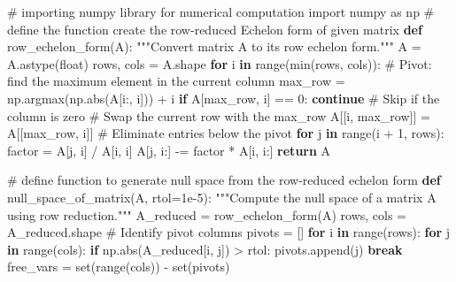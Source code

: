 \documentclass[
  letterpaper,
  DIV=11,
  numbers=noendperiod]{scrreprt}
\newenvironment{Shaded}{\begin{snugshade}}{\end{snugshade}}
\newcommand{\BuiltInTok}[1]{\textcolor[rgb]{0.00,0.23,0.31}{#1}}
\newcommand{\CommentTok}[1]{\textcolor[rgb]{0.37,0.37,0.37}{#1}}
\newcommand{\ControlFlowTok}[1]{\textcolor[rgb]{0.00,0.23,0.31}{\textbf{#1}}}
\newcommand{\DecValTok}[1]{\textcolor[rgb]{0.68,0.00,0.00}{#1}}
\newcommand{\FloatTok}[1]{\textcolor[rgb]{0.68,0.00,0.00}{#1}}
\newcommand{\ImportTok}[1]{\textcolor[rgb]{0.00,0.46,0.62}{#1}}
\newcommand{\KeywordTok}[1]{\textcolor[rgb]{0.00,0.23,0.31}{\textbf{#1}}}
\newcommand{\NormalTok}[1]{\textcolor[rgb]{0.00,0.23,0.31}{#1}}
\newcommand{\OperatorTok}[1]{\textcolor[rgb]{0.37,0.37,0.37}{#1}}
\theoremstyle{plain}
\theoremstyle{definition}
\theoremstyle{remark}
\begin{document}
\begin{Shaded}
\begin{Highlighting}[]
\CommentTok{\# importing numpy library for numerical computation}
\ImportTok{import}\NormalTok{ numpy }\ImportTok{as}\NormalTok{ np}
\CommentTok{\# define the function create the row{-}reduced Echelon form of given matrix}
\KeywordTok{def}\NormalTok{ row\_echelon\_form(A):}
    \CommentTok{"""Convert matrix A to its row echelon form."""}
\NormalTok{    A }\OperatorTok{=}\NormalTok{ A.astype(}\BuiltInTok{float}\NormalTok{)}
\NormalTok{    rows, cols }\OperatorTok{=}\NormalTok{ A.shape}
    \ControlFlowTok{for}\NormalTok{ i }\KeywordTok{in} \BuiltInTok{range}\NormalTok{(}\BuiltInTok{min}\NormalTok{(rows, cols)):}
        \CommentTok{\# Pivot: find the maximum element in the current column}
\NormalTok{        max\_row }\OperatorTok{=}\NormalTok{ np.argmax(np.}\BuiltInTok{abs}\NormalTok{(A[i:, i])) }\OperatorTok{+}\NormalTok{ i}
        \ControlFlowTok{if}\NormalTok{ A[max\_row, i] }\OperatorTok{==} \DecValTok{0}\NormalTok{:}
            \ControlFlowTok{continue}  \CommentTok{\# Skip if the column is zero}
        \CommentTok{\# Swap the current row with the max\_row}
\NormalTok{        A[[i, max\_row]] }\OperatorTok{=}\NormalTok{ A[[max\_row, i]]}
        \CommentTok{\# Eliminate entries below the pivot}
        \ControlFlowTok{for}\NormalTok{ j }\KeywordTok{in} \BuiltInTok{range}\NormalTok{(i }\OperatorTok{+} \DecValTok{1}\NormalTok{, rows):}
\NormalTok{            factor }\OperatorTok{=}\NormalTok{ A[j, i] }\OperatorTok{/}\NormalTok{ A[i, i]}
\NormalTok{            A[j, i:] }\OperatorTok{{-}=}\NormalTok{ factor }\OperatorTok{*}\NormalTok{ A[i, i:]}
    \ControlFlowTok{return}\NormalTok{ A}

\CommentTok{\# define function to generate null space from the row{-}reduced echelon form}
\KeywordTok{def}\NormalTok{ null\_space\_of\_matrix(A, rtol}\OperatorTok{=}\FloatTok{1e{-}5}\NormalTok{):}
    \CommentTok{"""Compute the null space of a matrix A using row reduction."""}
\NormalTok{    A\_reduced }\OperatorTok{=}\NormalTok{ row\_echelon\_form(A)}
\NormalTok{    rows, cols }\OperatorTok{=}\NormalTok{ A\_reduced.shape}
    \CommentTok{\# Identify pivot columns}
\NormalTok{    pivots }\OperatorTok{=}\NormalTok{ []}
    \ControlFlowTok{for}\NormalTok{ i }\KeywordTok{in} \BuiltInTok{range}\NormalTok{(rows):}
        \ControlFlowTok{for}\NormalTok{ j }\KeywordTok{in} \BuiltInTok{range}\NormalTok{(cols):}
            \ControlFlowTok{if}\NormalTok{ np.}\BuiltInTok{abs}\NormalTok{(A\_reduced[i, j]) }\OperatorTok{\textgreater{}}\NormalTok{ rtol:}
\NormalTok{                pivots.append(j)}
                \ControlFlowTok{break}
\NormalTok{    free\_vars }\OperatorTok{=} \BuiltInTok{set}\NormalTok{(}\BuiltInTok{range}\NormalTok{(cols)) }\OperatorTok{{-}} \BuiltInTok{set}\NormalTok{(pivots)}
    

\end{Highlighting}
\end{Shaded}
\end{document}
